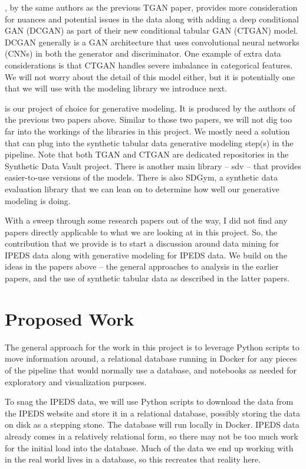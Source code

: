 \documentclass[sigconf, authorversion, nonacm]{acmart}
\begin{document}
    \cite{DBLP:journals/corr/abs-1907-00503}, by the same authors as the previous TGAN paper, provides more consideration for nuances and potential issues in the data along with adding a deep conditional GAN (DCGAN) as part of their new conditional tabular GAN (CTGAN) model. DCGAN generally is a GAN architecture that uses convolutional neural networks (CNNs) in both the generator and discriminator. One example of extra data considerations is that CTGAN handles severe imbalance in categorical features. We will not worry about the detail of this model either, but it is potentially one that we will use with the modeling library we introduce next.

    \cite{sdv} is our project of choice for generative modeling. It is produced by the authors of the previous two papers above. Similar to those two papers, we will not dig too far into the workings of the libraries in this project. We mostly need a solution that can plug into the synthetic tabular data generative modeling step(s) in the pipeline. Note that both TGAN and CTGAN are dedicated repositories in the Synthetic Data Vault project. There is another main library -- sdv -- that provides easier-to-use versions of the models. There is also SDGym, a synthetic data evaluation library that we can lean on to determine how well our generative modeling is doing.

    With a sweep through some research papers out of the way, I did not find any papers directly applicable to what we are looking at in this project. So, the contribution that we provide is to start a discussion around data mining for IPEDS data along with generative modeling for IPEDS data. We build on the ideas in the papers above -- the general approaches to analysis in the earlier papers, and the use of synthetic tabular data as described in the latter papers.

\section{Proposed Work}
    The general approach for the work in this project is to leverage Python scripts to move information around, a relational database running in Docker for any pieces of the pipeline that would normally use a database, and notebooks as needed for exploratory and visualization purposes.

    To snag the IPEDS data, we will use Python scripts to download the data from the IPEDS website and store it in a relational database, possibly storing the data on disk as a stepping stone. The database will run locally in Docker. IPEDS data already comes in a relatively relational form, so there may not be too much work for the initial load into the database. Much of the data we end up working with in the real world lives in a database, so this recreates that reality here.
\end{document}
